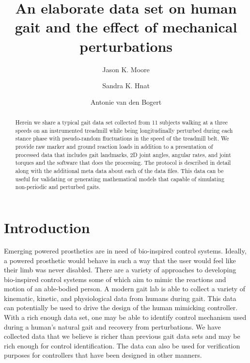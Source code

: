 \documentclass[10pt,a4paper,twocolumn]{article}
\begin{document}
\title{An elaborate data set on human gait and the effect of mechanical
  perturbations}

\author[1]{Jason K. Moore}
\author[1]{Sandra K. Hnat}
\author[1]{Antonie van den Bogert}


\maketitle
\thispagestyle{fancy}

\begin{abstract}

  Herein we share a typical gait data set collected from 11 subjects walking at
  a three speeds on an instrumented treadmill while being longitudinally
  perturbed during each stance phase with pseudo-random fluctuations in the
  speed of the treadmill belt. We provide raw marker and ground reaction loads in addition
  to a presentation of processed data that includes gait landmarks, 2D joint
  angles, angular rates, and joint torques and the software that does the
  processing. The protocol is described in detail along with the additional
  meta data about each of the data files. This data can be useful for
  validating or generating mathematical models that capable of simulating
  non-periodic and perturbed gaits.

\end{abstract}
\clearpage

\section*{Introduction}
%
Emerging powered prosthetics are in need of bio-inspired control systems.
Ideally, a powered prosthetic would behave in such a way that the user would
feel like their limb was never disabled. There are a variety of approaches to
developing bio-inspired control systems some of which aim to mimic the
reactions and motion of an able-bodied person. A modern gait lab is able to
collect a variety of kinematic, kinetic, and physiological data from humans
during gait. This data can potentially be used to drive the design of the human
mimicking controller. With a rich enough data set, one may be able to identify
control mechanism used during a human's natural gait and recovery from
perturbations. We have collected data that we believe is richer than previous
gait data sets and may be rich enough for control identification. The data can
also be used for verification purposes for controllers that have been designed
in other manners.
\end{document}
